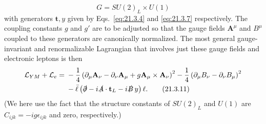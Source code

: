 \begin{equation}
G=SU(2)_L\times U(1)
\tag{21.3.10}\label{eq:21.3.10}
\end{equation}
with generators $\mathbf{t},y$ given by Eqs.~\eqref{eq:21.3.4} and \eqref{eq:21.3.7} respectively. The coupling constants $g$ and $g'$ are to be adjusted so that the gauge fields $\mathbf{A}^\mu$ and $B^\mu$ coupled to these generators are canonically normalized. The most general gauge-invariant and renormalizable Lagrangian that involves just these gauge fields and electronic leptons is then
\begin{align}
\mathcal{L}_{YM}+\mathcal{L}_e
={}&-\frac{1}{4}
\left(\partial_\mu\mathbf{A}_\nu-\partial_\nu\mathbf{A}_\mu
+g\mathbf{A}_\mu\mathbin{\times}\mathbf{A}_\nu\right)^2
-\frac{1}{4}\left(\partial_\mu B_\nu-\partial_\nu B_\mu\right)^2
\notag\\
&-\bar\ell\left(\sl{\partial}-i\mathbf{\sl A}\cdot\mathbf{t}_L-i\sl B\,y\right)\ell.
\tag{21.3.11}\label{eq:21.3.11}
\end{align}
(We here use the fact that the structure constants of $SU(2)_L$ and $U(1)$ are $C_{ijk}=-ig\epsilon_{ijk}$ and zero, respectively.)

